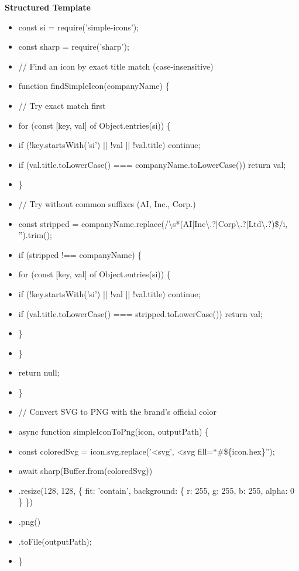 \documentclass[11pt]{article}
\begin{document}
\textbf{Structured Template}
\begin{itemize}[leftmargin=*,itemsep=2pt,topsep=2pt]
\item {} const si = require('simple-icons');
\item {} const sharp = require('sharp');
\item {} // Find an icon by exact title match (case-insensitive)
\item {} function findSimpleIcon(companyName) \{
\item {} // Try exact match first
\item {} for (const [key, val] of Object.entries(si)) \{
\item {} if (!key.startsWith('si') || !val || !val.title) continue;
\item {} if (val.title.toLowerCase() === companyName.toLowerCase()) return val;
\item {} \}
\item {} // Try without common suffixes (AI, Inc., Corp.)
\item {} const stripped = companyName.replace(/\textbackslash{}s*(AI|Inc\textbackslash{}.?|Corp\textbackslash{}.?|Ltd\textbackslash{}.?)\$/i, '').trim();
\item {} if (stripped !== companyName) \{
\item {} for (const [key, val] of Object.entries(si)) \{
\item {} if (!key.startsWith('si') || !val || !val.title) continue;
\item {} if (val.title.toLowerCase() === stripped.toLowerCase()) return val;
\item {} \}
\item {} \}
\item {} return null;
\item {} \}
\item {} // Convert SVG to PNG with the brand's official color
\item {} async function simpleIconToPng(icon, outputPath) \{
\item {} const coloredSvg = icon.svg.replace('<svg', <svg fill=``\#\$\{icon.hex\}'');
\item {} await sharp(Buffer.from(coloredSvg))
\item {} .resize(128, 128, \{ fit: 'contain', background: \{ r: 255, g: 255, b: 255, alpha: 0 \} \})
\item {} .png()
\item {} .toFile(outputPath);
\item {} \}
\end{itemize}
\end{document}
